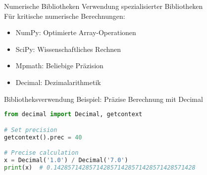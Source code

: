 \begin{remark2}{Numerische Bibliotheken} Verwendung spezialisierter Bibliotheken\\
Für kritische numerische Berechnungen:
\begin{itemize}
    \item NumPy: Optimierte Array-Operationen
    \item SciPy: Wissenschaftliches Rechnen
    \item Mpmath: Beliebige Präzision
    \item Decimal: Dezimalarithmetik
\end{itemize}
\end{remark2}

\begin{example2}{Bibliotheksverwendung} Beispiel: Präzise Berechnung mit Decimal\\
\begin{lstlisting}[language=Python, style=basesmol]
from decimal import Decimal, getcontext

# Set precision
getcontext().prec = 40

# Precise calculation
x = Decimal('1.0') / Decimal('7.0')
print(x)  # 0.1428571428571428571428571428571428571428
\end{lstlisting}
\end{example2}